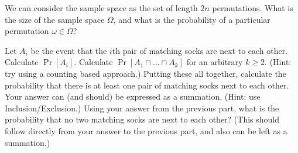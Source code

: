 \documentclass[11pt]{article}
\begin{document}
\begin{Parts}
    \Part We can consider the sample space as the set of length $2n$ permutations. What is the size of the sample space $\Omega$, and what is the probability of a particular permutation $\omega \in \Omega$?

    \Part Let $A_i$ be the event that the $i$th pair of matching socks are next to each other. Calculate $\Pr[A_i]$.
    \Part Calculate $\Pr[A_1 \cap  ... \cap A_k]$ for an arbitrary $k \geq 2$. (Hint: try using a counting based approach.)
    \Part Putting these all together, calculate the probability that there is at least one pair of matching socks next to each other. Your answer can (and should) be expressed as a summation. (Hint: use Inclusion/Exclusion.)
    \Part Using your answer from the previous part, what is the probability that no two matching socks are next to each other? (This should follow directly from your answer to the previous part, and also can be left as a summation.)
\end{Parts}
\end{document}
